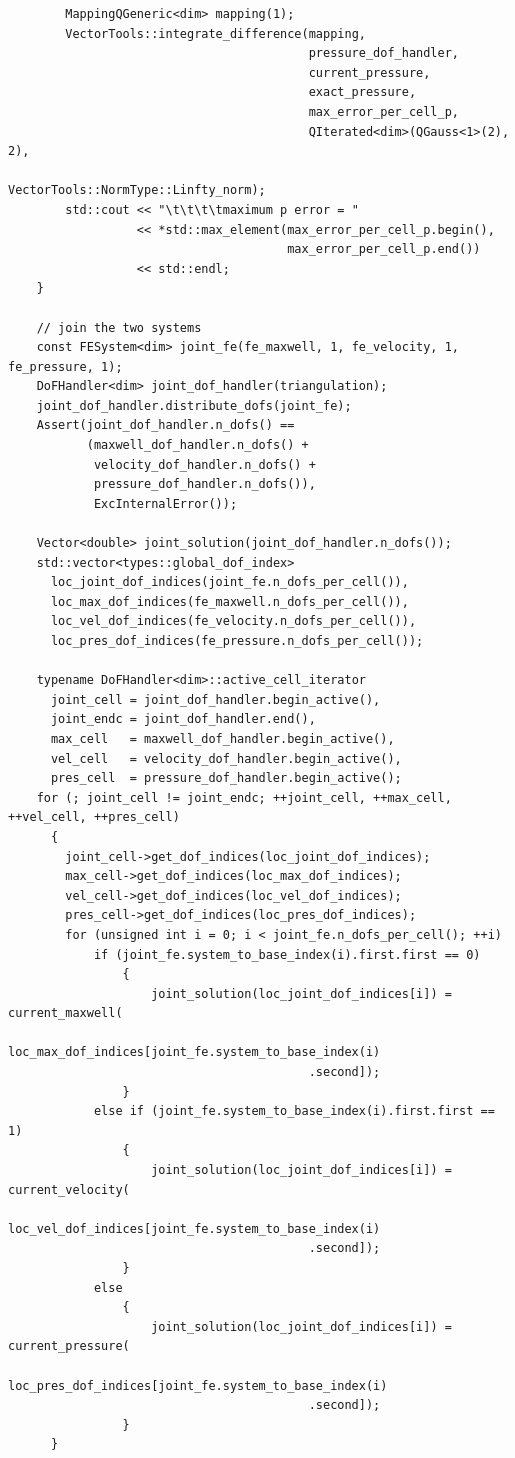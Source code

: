 \documentclass{article}
\begin{document}
\begin{lstlisting}
        MappingQGeneric<dim> mapping(1);
        VectorTools::integrate_difference(mapping,
                                          pressure_dof_handler,
                                          current_pressure,
                                          exact_pressure,
                                          max_error_per_cell_p,
                                          QIterated<dim>(QGauss<1>(2), 2),
                                          VectorTools::NormType::Linfty_norm);
        std::cout << "\t\t\t\tmaximum p error = "
                  << *std::max_element(max_error_per_cell_p.begin(),
                                       max_error_per_cell_p.end())
                  << std::endl;
    }

    // join the two systems
    const FESystem<dim> joint_fe(fe_maxwell, 1, fe_velocity, 1, fe_pressure, 1);
    DoFHandler<dim> joint_dof_handler(triangulation);
    joint_dof_handler.distribute_dofs(joint_fe);
    Assert(joint_dof_handler.n_dofs() ==
           (maxwell_dof_handler.n_dofs() +
            velocity_dof_handler.n_dofs() +
            pressure_dof_handler.n_dofs()),
            ExcInternalError());

    Vector<double> joint_solution(joint_dof_handler.n_dofs());
    std::vector<types::global_dof_index>
      loc_joint_dof_indices(joint_fe.n_dofs_per_cell()),
      loc_max_dof_indices(fe_maxwell.n_dofs_per_cell()),
      loc_vel_dof_indices(fe_velocity.n_dofs_per_cell()),
      loc_pres_dof_indices(fe_pressure.n_dofs_per_cell());

    typename DoFHandler<dim>::active_cell_iterator
      joint_cell = joint_dof_handler.begin_active(),
      joint_endc = joint_dof_handler.end(),
      max_cell   = maxwell_dof_handler.begin_active(),
      vel_cell   = velocity_dof_handler.begin_active(),
      pres_cell  = pressure_dof_handler.begin_active();
    for (; joint_cell != joint_endc; ++joint_cell, ++max_cell, ++vel_cell, ++pres_cell)
      {
        joint_cell->get_dof_indices(loc_joint_dof_indices);
        max_cell->get_dof_indices(loc_max_dof_indices);
        vel_cell->get_dof_indices(loc_vel_dof_indices);
        pres_cell->get_dof_indices(loc_pres_dof_indices);
        for (unsigned int i = 0; i < joint_fe.n_dofs_per_cell(); ++i)
            if (joint_fe.system_to_base_index(i).first.first == 0)
                {
                    joint_solution(loc_joint_dof_indices[i]) = current_maxwell(
                        loc_max_dof_indices[joint_fe.system_to_base_index(i)
                                          .second]);
                }
            else if (joint_fe.system_to_base_index(i).first.first == 1)
                {
                    joint_solution(loc_joint_dof_indices[i]) = current_velocity(
                        loc_vel_dof_indices[joint_fe.system_to_base_index(i)
                                          .second]);
                }
            else
                {
                    joint_solution(loc_joint_dof_indices[i]) = current_pressure(
                        loc_pres_dof_indices[joint_fe.system_to_base_index(i)
                                          .second]);
                }
      }


\end{lstlisting}
\end{document}
